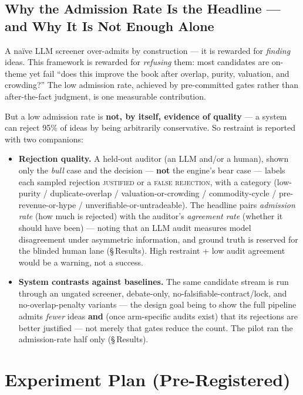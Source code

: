 \documentclass[11pt]{article}
\begin{document}
\subsection*{Why the Admission Rate Is the Headline --- and Why It Is Not Enough Alone}

A na\"{i}ve LLM screener over-admits by construction --- it is rewarded for \emph{finding} ideas.
This framework is rewarded for \emph{refusing} them: most candidates are on-theme yet fail ``does
this improve the book after overlap, purity, valuation, and crowding?'' The low admission rate,
achieved by pre-committed gates rather than after-the-fact judgment, is one measurable contribution.

But a low admission rate is \textbf{not, by itself, evidence of quality} --- a system can reject
95\% of ideas by being arbitrarily conservative. So restraint is reported with two companions:

\begin{itemize}
  \item \textbf{Rejection quality.} A held-out auditor (an LLM
    and/or a human), shown only the \emph{bull} case and the decision --- \textbf{not} the engine's
    bear case --- labels each sampled rejection \textsc{justified} or a \textsc{false rejection},
    with a category (low-purity / duplicate-overlap / valuation-or-crowding / commodity-cycle /
    pre-revenue-or-hype / unverifiable-or-untradeable). The headline pairs \emph{admission rate}
    (how much is rejected) with the auditor's \emph{agreement rate} (whether it should have been) ---
    noting that an LLM audit measures model disagreement under asymmetric information, and ground
    truth is reserved for the blinded human lane (\S\,Results). High
    restraint + low audit agreement would be a warning, not a success.

  \item \textbf{System contrasts against baselines.} The same candidate stream is run through an
    ungated
    screener, debate-only, no-falsifiable-contract/lock, and no-overlap-penalty variants --- the
    design goal being to show the full pipeline admits \emph{fewer} ideas \textbf{and} (once
    arm-specific audits exist) that its rejections are better
    justified --- not merely that gates reduce the count. The pilot ran the admission-rate half
    only (\S\,Results).
\end{itemize}

\section{Experiment Plan (Pre-Registered)}
\label{sec:experiment-plan}
\end{document}
